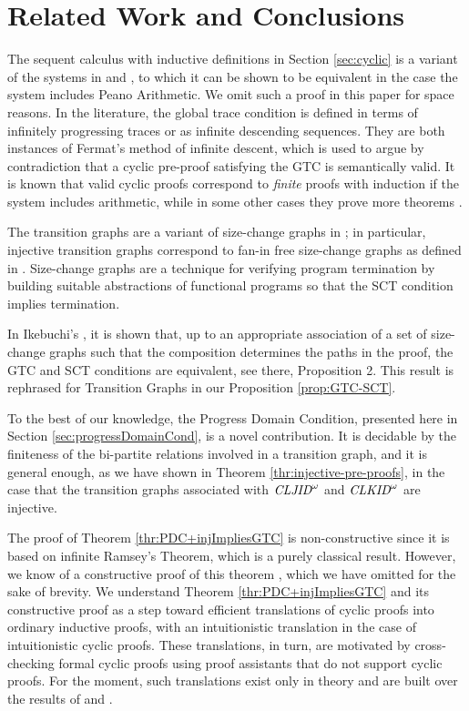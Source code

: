 \section{Related Work and Conclusions}
\label{sec:Related}

The sequent calculus with inductive definitions in Section \ref{sec:cyclic} is a variant of the systems in \cite{Brotherston1,Brotherston2} and \cite{BrotherstonSimpson}, to which it can be shown to be equivalent in the case the system includes Peano Arithmetic.
We omit such a proof in this paper for space reasons. %
In the literature, the global trace condition is defined in terms of infinitely progressing traces or as infinite descending sequences. They are both instances of Fermat's method of infinite descent, which is used to argue by contradiction that a cyclic pre-proof satisfying the GTC is semantically valid. It is known that valid cyclic proofs correspond to \emph{finite} proofs with induction if the system includes arithmetic, while in some other cases they prove more theorems \cite{Berardi}.

The transition graphs are a variant of size-change graphs in \cite{Lee1,Lee2,Lee3}; in particular, injective transition graphs correspond to fan-in free size-change graphs
as defined in \cite[\S 2.4]{Lee3}. Size-change graphs are a technique for verifying program termination by building suitable abstractions of functional programs so that the SCT condition implies termination. 

In Ikebuchi's \cite{Mirai}, it is shown that, up to an appropriate association of a set of size-change graphs such that the composition determines the paths in the proof, the GTC and SCT conditions are equivalent, see there, Proposition 2. This result is rephrased for Transition Graphs 
in our Proposition \ref{prop:GTC-SCT}. 

To the best of our knowledge, the Progress Domain Condition, presented here in Section 
\ref{sec:progressDomainCond}, is a novel contribution.
It is decidable by the finiteness of the bi-partite relations involved in a transition graph, and it is general enough, as we have shown in Theorem \ref{thr:injective-pre-proofs},
in the case that the transition graphs associated with %
$\textit{CLJID}^\omega$ and $\textit{CLKID}^\omega$ are injective.

The proof of Theorem \ref{thr:PDC+injImpliesGTC} is non-constructive since it is based on infinite Ramsey's Theorem, which is a purely classical result. However, we know
of a constructive proof of this theorem \cite{BERARDI20151382}, which we have omitted for the sake of brevity. We understand Theorem \ref{thr:PDC+injImpliesGTC} and its constructive proof as a step toward efficient translations of cyclic proofs into ordinary inductive proofs, with an intuitionistic
translation in the case of intuitionistic cyclic proofs. These translations, in turn, are motivated
by cross-checking formal cyclic proofs using proof assistants that do not support cyclic proofs.
For the moment, such translations exist only in theory and are built over the
results of \cite{Berardi} and \cite{Mirai}.

